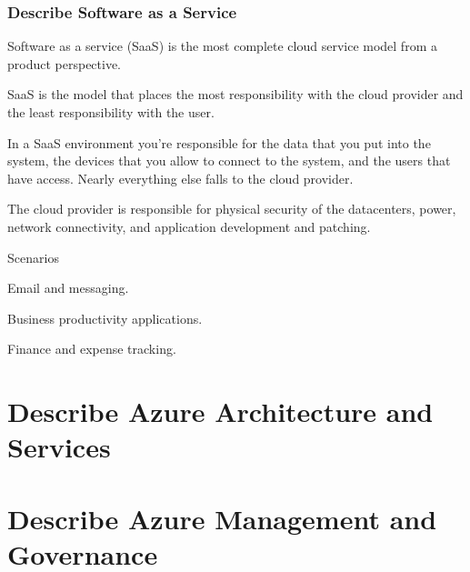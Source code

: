 \documentclass[12pt,a4paper]{report}
\begin{document}
\subsection{Describe Software as a Service}
\begin{mylist1}
    \item Software as a service (SaaS) is the most complete cloud service model from a product perspective.
    \item SaaS is the model that places the most responsibility with the cloud provider and the least responsibility with the user.
    \item In a SaaS environment you're responsible for the data that you put into the system, the devices that you allow to connect to the system, and the users that have access. Nearly everything else falls to the cloud provider.
    \item The cloud provider is responsible for physical security of the datacenters, power, network connectivity, and application development and patching.
    \item Scenarios
    \begin{mylist2}
        \item Email and messaging.
        \item Business productivity applications.
        \item Finance and expense tracking.
    \end{mylist2}
\end{mylist1}
\chapter{Describe Azure Architecture and Services}
\section{}
\chapter{Describe Azure Management and Governance}
\section{}

\begin{mylist2}
    \item 
    \item 
\end{mylist2}
\end{document}
